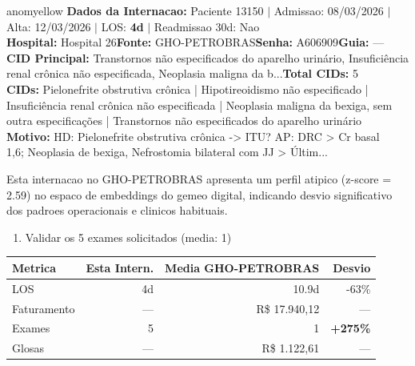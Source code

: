 \documentclass[a4paper,10pt]{article}
\begin{document}
\begin{anomalycard}[Internacao 167884 | GHO-PETROBRAS | MODERADO (z=2.59)]{anomyellow}
\textbf{Dados da Internacao:} Paciente 13150 $\mid$ Admissao: 08/03/2026 $\mid$ Alta: 12/03/2026 $\mid$ LOS: \textbf{4d} $\mid$ Readmissao 30d: Nao\\
\textbf{Hospital:} Hospital 26\quad\textbf{Fonte:} GHO-PETROBRAS\quad\textbf{Senha:} A606909\quad\textbf{Guia:} ---\\
\textbf{CID Principal:} {\small Transtornos não especificados do aparelho urinário, Insuficiência renal crônica não especificada, Neoplasia maligna da b...}\quad\textbf{Total CIDs:} 5\\

\textbf{CIDs:} {\scriptsize Pielonefrite obstrutiva crônica | Hipotireoidismo não especificado | Insuficiência renal crônica não especificada | Neoplasia maligna da bexiga, sem outra especificações | Transtornos não especificados do aparelho urinário}\\

\textbf{Motivo:} {\scriptsize HD: Pielonefrite obstrutiva crônica -> ITU?  AP: DRC > Cr basal ~ 1,6; Neoplasia de bexiga, Nefrostomia bilateral com JJ > Últim...}\\

\vspace{2pt}\begin{tcolorbox}[colback=severityred!20,colframe=anomyellow,title={\textbf{Interpretacao de Negocio}},fonttitle=\bfseries\small,left=4pt,right=4pt,top=3pt,bottom=3pt]
{\small Esta internacao no GHO-PETROBRAS apresenta um perfil atipico (z-score = 2.59) no espaco de embeddings do gemeo digital, indicando desvio significativo dos padroes operacionais e clinicos habituais.}
\end{tcolorbox}
\begin{tcolorbox}[colback=severityyellow!30,colframe=anomorange,title={\textbf{Recomendacoes Especificas}},fonttitle=\bfseries\small,left=4pt,right=4pt,top=3pt,bottom=3pt]
\begin{enumerate}[nosep,leftmargin=16pt]
\item {\small Validar os 5 exames solicitados (media: 1)}
\end{enumerate}
\end{tcolorbox}
\begin{center}\begin{tabular}{l r r r}\toprule\textbf{Metrica} & \textbf{Esta Intern.} & \textbf{Media GHO-PETROBRAS} & \textbf{Desvio} \\\midrule
LOS & 4d & 10.9d & -63\% \\
Faturamento & --- & R\$ 17.940,12 & --- \\
Exames & 5 & 1 & \textcolor{anomred}{\textbf{+275\%}} \\
Glosas & --- & R\$ 1.122,61 & --- \\
\bottomrule\end{tabular}\end{center}


\end{anomalycard}
\end{document}
